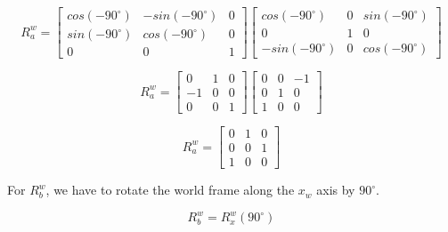 \documentclass[answers]{exam}
\begin{document}
\begin{questions}
\begin{parts}
\begin{solution}
            \begin{equation*}
                R^w_a = \begin{bmatrix}
                    cos(-90^{\circ}) & -sin(-90^{\circ}) & 0 \\
                    sin(-90^{\circ}) & cos(-90^{\circ})  & 0 \\
                    0                & 0                 & 1
                \end{bmatrix}
                \begin{bmatrix}
                    cos(-90^{\circ})  & 0 & sin(-90^{\circ}) \\
                    0                 & 1 & 0                \\
                    -sin(-90^{\circ}) & 0 & cos(-90^{\circ})
                \end{bmatrix}
            \end{equation*}

            \begin{equation*}
                R^w_a = \begin{bmatrix}
                    0  & 1 & 0 \\
                    -1 & 0 & 0 \\
                    0  & 0 & 1
                \end{bmatrix}
                \begin{bmatrix}
                    0 & 0 & -1 \\
                    0 & 1 & 0  \\
                    1 & 0 & 0
                \end{bmatrix}
            \end{equation*}

            \begin{equation*}
                R^w_a = \begin{bmatrix}
                    0 & 1 & 0 \\
                    0 & 0 & 1 \\
                    1 & 0 & 0
                \end{bmatrix}
            \end{equation*}

            For $R^w_b$, we have to rotate the world frame along the $x_w$ axis by
            $90^{\circ}$.

            \begin{equation*}
                R^w_b = R^w_x(90^{\circ})
            \end{equation*}


\end{solution}
\end{parts}
\end{questions}
\end{document}

